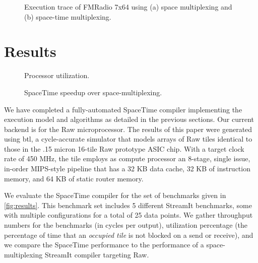 \begin{figure}[t]
\centering
{}
\vspace{-6pt}
\caption{Execution trace of FMRadio 7x64 using (a) space multiplexing and (b) space-time multiplexing.
\protect\label{fig:bloodgraph}}
\end{figure}

\section{Results}
\label{sec:results}

\begin{figure*}[t]
\centering
{}
\vspace{-6pt}
\caption{Benchmark characteristics, performance evaluation and
comparison to space-multiplexing. 
\protect\label{fig:results}}
\end{figure*}
\begin{figure}[t]
\centering
\hspace{-0.1in}
\vspace{-6pt}
\caption{Processor utilization.
\protect\label{fig:util}}
\end{figure}

\begin{figure}[t]
\centering
\hspace{-0.1in}
\vspace{-6pt}
\caption{SpaceTime speedup over space-multiplexing.
\protect\label{fig:speedup}}
\end{figure}


We have completed a fully-automated SpaceTime compiler implementing
the execution model and algorithms as detailed in the previous
sections. Our current backend is for the Raw microprocessor. The
results of this paper were generated using btl, a cycle-accurate
simulator that models arrays of Raw tiles identical to those in the
.15 micron 16-tile Raw prototype ASIC chip.  With a target clock rate
of 450 MHz, the tile employs as compute processor an 8-stage, single
issue, in-order MIPS-style pipeline that has a 32 KB data cache, 32 KB
of instruction memory, and 64 KB of static router memory.

We evaluate the SpaceTime compiler for the set of benchmarks given in
\ref{fig:results}.  This benchmark set includes 5 different StreamIt
benchmarks, some with multiple configurations for a total of 25 data
points.  We gather throughput numbers for the benchmarks (in cycles
per output), utilization percentage (the percentage of time that an
{\it occupied tile} is not blocked on a send or receive), and we
compare the SpaceTime performance to the performance of a
space-multiplexing StreamIt compiler targeting Raw.  

